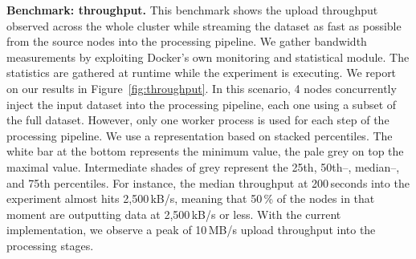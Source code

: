 \textbf{Benchmark: throughput.}
This benchmark shows the upload throughput observed across the whole cluster while streaming the dataset as fast as possible from the source nodes into the processing pipeline.
We gather bandwidth measurements by exploiting Docker's own monitoring and statistical module.
The statistics are gathered at runtime while the experiment is executing.
We report on our results in Figure~\ref{fig:throughput}.
In this scenario, 4 nodes concurrently inject the input dataset into the processing pipeline, each one using a subset of the full dataset.
However, only one worker process is used for each step of the processing pipeline.
We use a representation based on stacked percentiles.
The white bar at the bottom represents the minimum value, the pale grey on top the maximal value.
Intermediate shades of grey represent the 25th, 50th–, median–, and 75th percentiles.
For instance, the median throughput at 200\,seconds into the experiment almost hits 2,500\,kB/s, meaning that 50\,\% of the nodes in that moment are outputting data at 2,500\,kB/s or less.
With the current implementation, we observe a peak of 10\,MB/s upload throughput into the processing stages.%


